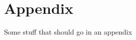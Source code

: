 

\chapter*{Appendix}\label{appendix}



\pagestyle{plain} %

Some stuff that should go in an appendix

